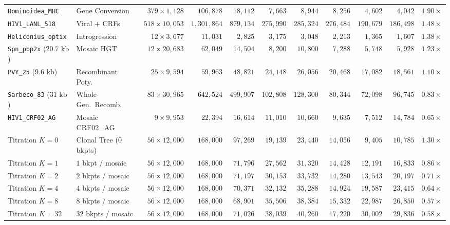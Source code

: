 \documentclass[11pt,a4paper]{article}
\begin{document}
\begin{table}[t!]
{\begin{tabular}{@{}llrrrrrrrrr@{}}
\midrule
\texttt{Hominoidea\_MHC} & Gene Conversion & $379 \times 1,128$ & $106,878$ & $18,112$ & $7,663$ & $8,944$ & $8,256$ & $4,602$ & $4,042$ & $1.90\times$ \\
\texttt{HIV1\_LANL\_518} & Viral + CRFs & $518 \times 10,053$ & $1,301,864$ & $879,134$ & $275,990$ & $285,324$ & $276,484$ & $190,679$ & $186,498$ & $1.48\times$ \\
\texttt{Heliconius\_optix} & Introgression & $12 \times 3,677$ & $11,031$ & $2,825$ & $3,175$ & $3,048$ & $2,213$ & $1,365$ & $1,607$ & $1.38\times$ \\
\texttt{Spn\_pbp2x} ($20.7\text{ kb}$) & Mosaic HGT & $12 \times 20,683$ & $62,049$ & $14,504$ & $8,200$ & $10,800$ & $7,288$ & $5,748$ & $5,928$ & $1.23\times$ \\
\texttt{PVY\_25} ($9.6\text{ kb}$) & Recombinant Poty.\ & $25 \times 9,594$ & $59,963$ & $48,821$ & $24,148$ & $26,056$ & $20,468$ & $17,082$ & $18,561$ & $1.10\times$ \\
\texttt{Sarbeco\_83} ($31\text{ kb}$) & Whole-Gen.\ Recomb.\ & $83 \times 30,965$ & $642,524$ & $499,907$ & $102,808$ & $128,300$ & $80,344$ & $72,098$ & $96,745$ & $0.83\times$ \\
\texttt{HIV1\_CRF02\_AG} & Mosaic CRF02\_AG & $9 \times 9,953$ & $22,394$ & $16,614$ & $11,010$ & $10,660$ & $9,635$ & $7,512$ & $14,784$ & $0.65\times$ \\
\midrule
Titration $K = 0$ & Clonal Tree ($0$ bkpts) & $56 \times 12,000$ & $168,000$ & $97,269$ & $19,139$ & $23,440$ & $14,056$ & $9,405$ & $10,785$ & $1.30\times$ \\
Titration $K = 1$ & $1$ bkpt / mosaic & $56 \times 12,000$ & $168,000$ & $71,796$ & $27,562$ & $31,320$ & $14,428$ & $12,191$ & $16,833$ & $0.86\times$ \\
Titration $K = 2$ & $2$ bkpts / mosaic & $56 \times 12,000$ & $168,000$ & $71,197$ & $30,153$ & $33,732$ & $14,280$ & $13,543$ & $20,197$ & $0.71\times$ \\
Titration $K = 4$ & $4$ bkpts / mosaic & $56 \times 12,000$ & $168,000$ & $70,371$ & $32,132$ & $35,288$ & $14,924$ & $19,587$ & $23,415$ & $0.64\times$ \\
Titration $K = 8$ & $8$ bkpts / mosaic & $56 \times 12,000$ & $168,000$ & $68,901$ & $35,506$ & $38,384$ & $15,332$ & $22,987$ & $26,850$ & $0.57\times$ \\
Titration $K = 32$ & $32$ bkpts / mosaic & $56 \times 12,000$ & $168,000$ & $71,026$ & $38,039$ & $40,260$ & $17,220$ & $30,002$ & $29,836$ & $0.58\times$ \\
\bottomrule
\end{tabular}%
}
\end{table}
\end{document}
